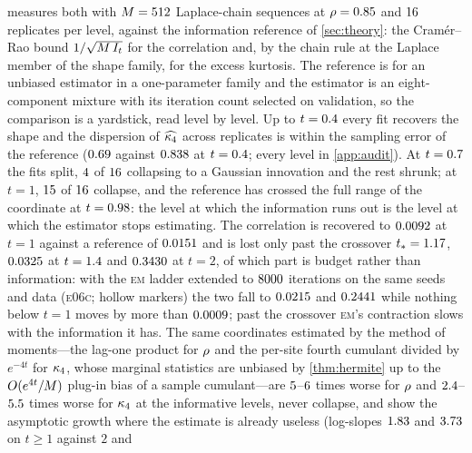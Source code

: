  measures both with $M=512$ Laplace-chain sequences at
$\rho=0.85$ and $16$ replicates per level, against the information
reference of \cref{sec:theory}: the Cram\'er--Rao bound $1/\sqrt{M\,I_t}$ for the
correlation and, by the chain rule at the Laplace member of the shape family, for the
excess kurtosis. The reference is for an unbiased estimator in a one-parameter family and
the estimator is an eight-component mixture with its iteration count selected on
validation, so the comparison is a yardstick, read level by level. Up to
$t=0.4$ every fit recovers the shape and the dispersion of
$\widehat{\kappa_4}$ across replicates is within the sampling error of the reference
($0.69$ against $0.838$ at $t=0.4$;
every level in \cref{app:audit}). At $t=0.7$ the fits split,
$4$ of $16$ collapsing to a Gaussian
innovation and the rest shrunk; at $t=1$, $15$ of $16$
collapse, and the reference has crossed the full range of the coordinate at
$t=0.98$: the level at which the information runs out is the level at
which the estimator stops estimating. The correlation is recovered to $0.0092$
at $t=1$ against a reference of $0.0151$ and is lost only past the crossover
$t_\ast=1.17$, $0.0325$ at $t=1.4$ and
$0.3430$ at $t=2$, of which part is budget rather than information: with the
\textsc{em} ladder extended to $8000$ iterations on the same seeds and
data (\textsc{e06c}; hollow markers) the two fall to $0.0215$ and
$0.2441$ while nothing below $t=1$ moves by more than
$0.0009$; past the crossover \textsc{em}'s contraction slows with
the information it has. The same coordinates estimated by the method of moments---the
lag-one product for $\rho$ and the per-site fourth cumulant divided by $e^{-4t}$ for
$\kappa_4$, whose marginal statistics are unbiased by \cref{thm:hermite} up to the
$O(e^{4t}/M)$ plug-in bias of a sample cumulant---are
$5$--$6$ times worse for $\rho$ and
$2.4$--$5.5$ times worse for $\kappa_4$ at the informative
levels, never collapse, and show the asymptotic growth where the estimate is already
useless (log-slopes $1.83$ and $3.73$ on $t\ge1$ against $2$ and
